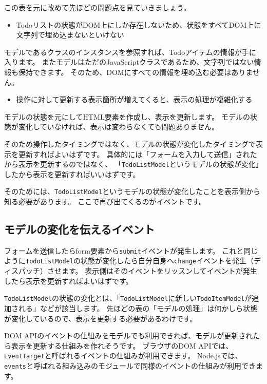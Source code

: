この表を元に改めて先ほどの問題点を見ていきましょう。

\begin{itemize}
\item Todoリストの状態がDOM上にしか存在しないため、状態をすべてDOM上に文字列で埋め込まないといけない
\end{itemize}

モデルであるクラスのインスタンスを参照すれば、Todoアイテムの情報が手に入ります。
またモデルはただのJavaScriptクラスであるため、文字列ではない情報も保持できます。
そのため、DOMにすべての情報を埋め込む必要はありません。

\begin{itemize}
\item 操作に対して更新する表示箇所が増えてくると、表示の処理が複雑化する
\end{itemize}

モデルの状態を元にしてHTML要素を作成し、表示を更新します。
モデルの状態が変化していなければ、表示は変わらなくても問題ありません。

そのため操作したタイミングではなく、モデルの状態が変化したタイミングで表示を更新すればよいはずです。
具体的には「フォームを入力して送信」されたから表示を更新するのではなく、
「\texttt{TodoListModel}というモデルの状態が変化」したから表示を更新すればいいはずです。

そのためには、\texttt{TodoListModel}というモデルの状態が変化したことを表示側から知る必要があります。
ここで再び出てくるのがイベントです。

\hypertarget{model-and-event}{%
\subsection{モデルの変化を伝えるイベント}\label{model-and-event}}

フォームを送信したらform要素から\texttt{submit}イベントが発生します。
これと同じように\texttt{TodoListModel}の状態が変化したら自分自身へ\texttt{change}イベントを発生（ディスパッチ）させます。
表示側はそのイベントをリッスンしてイベントが発生したら表示を更新すればよいはずです。

\texttt{TodoListModel}の状態の変化とは、「\texttt{TodoListModel}に新しい\texttt{TodoItemModel}が追加される」などが該当します。
先ほどの表の「モデルの処理」は何かしら状態が変化しているので、表示を更新する必要があるわけです。

DOM
APIのイベントの仕組みをモデルでも利用できれば、モデルが更新されたら表示を更新する仕組みを作れそうです。
ブラウザのDOM APIでは、\texttt{EventTarget}と呼ばれるイベントの仕組みが利用できます。
Node.jsでは、\texttt{events}と呼ばれる組み込みのモジュールで同様のイベントの仕組みが利用できます。

